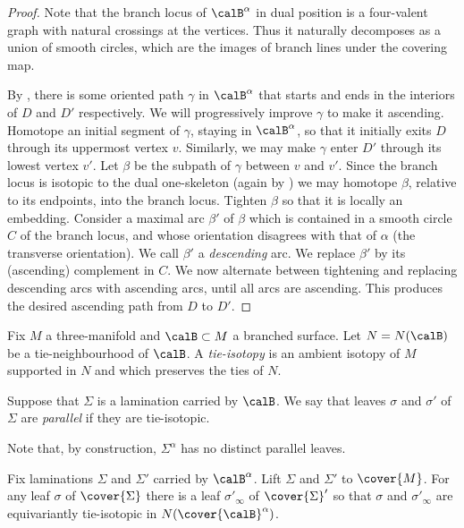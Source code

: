 \documentclass[12pt]{amsart}
\begin{document}
\begin{proof}
Note that the branch locus of $\calB^\alpha$ in dual position is a four-valent graph with natural crossings at the vertices.  Thus it naturally decomposes as a union of smooth circles, which are the images of branch lines under the covering map. 


By , there is some oriented path $\gamma$ in $\calB^\alpha$ that starts and ends in the interiors of $D$ and $D'$ respectively.  We will progressively improve $\gamma$ to make it ascending.  Homotope an initial segment of $\gamma$, staying in $\calB^\alpha$, so that it initially exits $D$ through its uppermost vertex $v$. Similarly, we may make $\gamma$ enter $D'$ through its lowest vertex $v'$.  Let $\beta$ be the subpath of $\gamma$ between $v$ and $v'$.  Since the branch locus is isotopic to the dual one-skeleton (again by ) we may homotope $\beta$, relative to its endpoints, into the branch locus.  Tighten $\beta$ so that it is locally an embedding.  Consider a maximal arc $\beta'$ of $\beta$ which is contained in a smooth circle $C$ of the branch locus, and whose orientation disagrees with that of $\alpha$ (the transverse orientation).  We call $\beta'$ a \emph{descending} arc.  We replace $\beta'$ by its (ascending) complement in $C$.  We now alternate between tightening and replacing descending arcs with ascending arcs, until all arcs are ascending.  This produces the desired ascending path from $D$ to $D'$. 
\end{proof}


\begin{definition}
\label{Def:Parallel}
Fix $M$ a three-manifold and $\calB \subset M$ a branched surface.  Let $N = N(\calB)$ be a tie-neighbourhood of $\calB$.  A \emph{tie-isotopy} is an ambient isotopy of $M$ supported in $N$ and which preserves the ties of $N$. 

Suppose that $\Sigma$ is a lamination carried by $\calB$.  We say that leaves $\sigma$ and $\sigma'$ of $\Sigma$ are \emph{parallel} if they are tie-isotopic.
\end{definition}

Note that, by construction, $\Sigma^\alpha$ has no distinct parallel leaves.


\begin{lemma}
\label{Lem:Squeeze} 
Fix laminations $\Sigma$ and $\Sigma'$ carried by $\calB^\alpha$.  Lift $\Sigma$ and $\Sigma'$ to $\cover{M}$. For any leaf $\sigma$ of $\cover{\Sigma}$ there is a leaf $\sigma'_\infty$ of $\cover{\Sigma}'$ so that $\sigma$ and $\sigma'_\infty$ are equivariantly tie-isotopic in $N(\cover{\calB}^\alpha)$.
\end{lemma}
\end{document}
